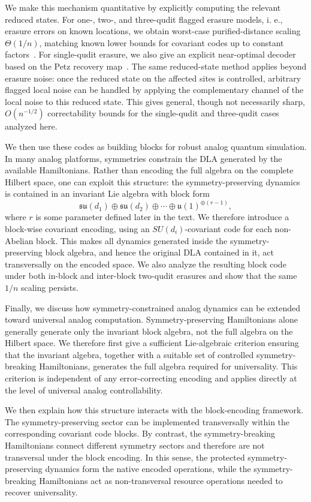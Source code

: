 \documentclass[10pt,twocolumn,superscriptaddress,aps,amsmath,amssymb,citeautoscript,floatfix,prx]{revtex4-2}
\newcounter{alg}
\theoremstyle{plain}
\theoremstyle{plain}
\theoremstyle{plain}
\theoremstyle{plain}
\theoremstyle{plain}
\theoremstyle{plain}
\begin{document}
We make this mechanism quantitative by explicitly computing the relevant reduced states. For one-, {two-,} and three-qudit flagged erasure models, i. e., erasure errors on known locations, we obtain worst-case purified-distance scaling $\Theta(1/n)$, matching known lower bounds for covariant codes up to constant factors~\cite{Faist2020,Zhou2021}. For single-qudit erasure, we also give an explicit near-optimal decoder based on the Petz recovery map~\cite{Petz1988, Barnum2002, Ng2010}. The same reduced-state method applies beyond erasure noise: once the reduced state on the affected sites is controlled, arbitrary flagged local noise can be handled by applying the complementary channel of the local noise to this reduced state. This gives general, though not necessarily sharp, $O(n^{-1/2})$ correctability bounds for the single-qudit and three-qudit cases analyzed here.

We then use these codes as building blocks for robust analog quantum simulation. In many analog platforms, symmetries constrain the DLA generated by the available Hamiltonians. Rather than encoding the full algebra on the complete Hilbert space, one can exploit this structure: the symmetry-preserving dynamics is contained in an invariant Lie algebra with block form
$$
\mathfrak{su}(d_1)\oplus\mathfrak{su}(d_2)\oplus\cdots
\oplus \mathfrak{u}(1)^{\oplus(r-1)},
$$
where $r$ is some parameter defined later in the text. We therefore introduce a block-wise covariant encoding, using an $SU(d_i)$-covariant code for each non-Abelian block. This makes all dynamics generated inside the symmetry-preserving block algebra, and hence the original DLA contained in it, act transversally on the encoded space. We also analyze the resulting block code under both in-block and inter-block two-qudit erasures and show that the same $1/n$ scaling persists.

Finally, we discuss how symmetry-constrained analog dynamics can be extended toward universal analog computation. Symmetry-preserving Hamiltonians alone generally generate only the invariant block algebra, not the full algebra on the Hilbert space. We therefore first give a sufficient Lie-algebraic criterion ensuring that the invariant algebra, together with a suitable set of controlled symmetry-breaking Hamiltonians, generates the full algebra required for universality. This criterion is independent of any error-correcting encoding and applies directly at the level of universal analog controllability.

We then explain how this structure interacts with the block-encoding framework. The symmetry-preserving sector can be implemented transversally within the corresponding covariant code blocks. By contrast, the symmetry-breaking Hamiltonians connect different symmetry sectors and therefore are not transversal under the block encoding. In this sense, the protected symmetry-preserving dynamics form the native encoded operations, while the symmetry-breaking Hamiltonians act as non-transversal resource operations needed to recover universality.
\end{document}
